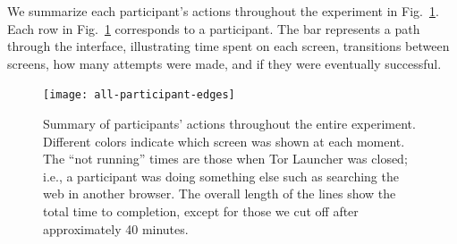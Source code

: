 \documentclass[USenglish,oneside,twocolumn]{article}
\begin{document}
{%




We summarize each participant's actions throughout the experiment in Fig.~\ref{fig:all-participant-edges}.
Each row in Fig.~\ref{fig:all-participant-edges} corresponds to a participant. The bar represents a path through the interface, illustrating time spent on each screen, transitions between screens, how many attempts were made, and if they were eventually successful. 

\begin{figure}
\centering
\texttt{[image: all-participant-edges]}
\caption{
Summary of participants' actions throughout the entire experiment.
Different colors indicate which screen was shown at each moment.
The ``not running'' times are those when Tor Launcher was closed;
i.e., a participant was doing something else
such as searching the web in another browser.
The overall length of the lines show the total time to completion,
except for those we cut off after approximately 40 minutes.
}
\label{fig:all-participant-edges}
\end{figure}

}
\end{document}
